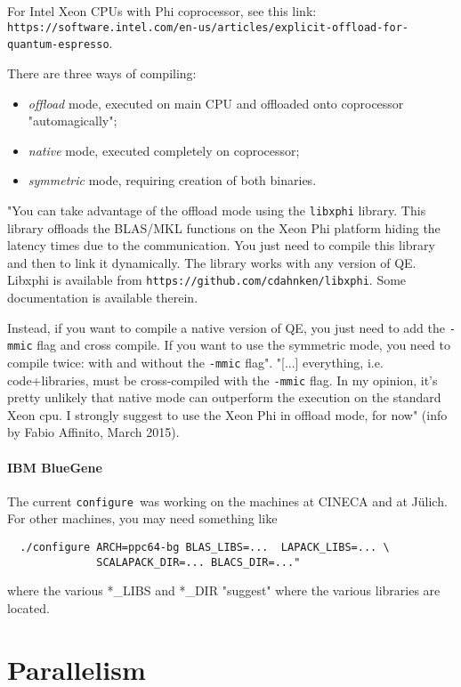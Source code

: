 \documentclass[12pt,a4paper]{article}
\def\configure{\texttt{configure}}
\begin{document}
For Intel Xeon CPUs with Phi coprocessor, see this link:\\
\texttt{https://software.intel.com/en-us/articles/explicit-offload-for-quantum-espresso}.

There are three ways of compiling:
\begin{itemize}
\item {\em offload} mode, executed on main CPU and offloaded onto coprocessor
"automagically";
\item {\em native} mode, executed completely on coprocessor;
\item {\em symmetric} mode, requiring creation of both binaries.
\end{itemize}
"You can take advantage of the offload mode using the \texttt{libxphi}
library. This library offloads the BLAS/MKL functions on the Xeon Phi
platform hiding the latency times due to the communication. You just
need to compile this library and then to link it dynamically. The
library works with any version of QE. Libxphi is available from
\texttt{https://github.com/cdahnken/libxphi}. Some documentation is
available therein.

Instead, if you want to compile a native version of QE, you just need
to add the \texttt{-mmic} flag and cross compile. If you want to use
the symmetric mode, you need to compile twice: with and without the
\texttt{-mmic} flag". "[...] everything, i.e. code+libraries, must be
cross-compiled with the \texttt{-mmic} flag. In my opinion, it's pretty
unlikely that native mode can outperform the execution on the standard
Xeon cpu. I strongly suggest to use the Xeon Phi in offload mode, for now"
(info by Fabio Affinito, March 2015).

\paragraph{IBM BlueGene}

The current \configure\ was working on the machines at CINECA and at J\"ulich.
For other machines, you may need something like
\begin{verbatim}
  ./configure ARCH=ppc64-bg BLAS_LIBS=...  LAPACK_LIBS=... \
              SCALAPACK_DIR=... BLACS_DIR=..."
\end{verbatim}
where the various *\_LIBS and *\_DIR "suggest" where the various libraries
are located.

\newpage

\section{Parallelism}
\label{Sec:para}
\end{document}
